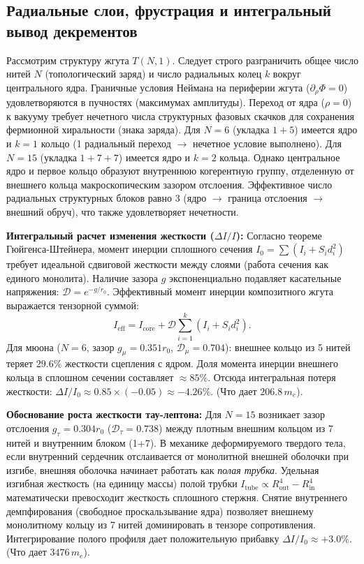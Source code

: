 \documentclass[11pt,a4paper]{article}
\begin{document}
\subsection{Радиальные слои, фрустрация и интегральный вывод декрементов}
Рассмотрим структуру жгута $T(N,1)$. Следует строго разграничить общее число нитей $N$ (топологический заряд) и число радиальных колец $k$ вокруг центрального ядра. 
Граничные условия Неймана на периферии жгута ($\partial_\rho \Phi = 0$) удовлетворяются в пучностях (максимумах амплитуды). Переход от ядра ($\rho=0$) к вакууму требует нечетного числа структурных фазовых скачков для сохранения фермионной хиральности (знака заряда).
Для $N=6$ (укладка $1+5$) имеется ядро и $k=1$ кольцо (1 радиальный переход $\to$ нечетное условие выполнено).
Для $N=15$ (укладка $1+7+7$) имеется ядро и $k=2$ кольца. Однако центральное ядро и первое кольцо образуют внутреннюю когерентную группу, отделенную от внешнего кольца макроскопическим зазором отслоения. Эффективное число радиальных структурных блоков равно 3 (ядро $\to$ граница отслоения $\to$ внешний обруч), что также удовлетворяет нечетности.

\textbf{Интегральный расчет изменения жесткости ($\Delta I/I$):}
Согласно теореме Гюйгенса-Штейнера, момент инерции сплошного сечения $I_0 = \sum (I_i + S_i d_i^2)$ требует идеальной сдвиговой жесткости между слоями (работа сечения как единого монолита). Наличие зазора $g$ экспоненциально подавляет касательные напряжения: $\mathcal{D} = e^{-g/r_0}$. Эффективный момент инерции композитного жгута выражается тензорной суммой:
\begin{equation}
I_{\text{eff}} = I_{\text{core}} + \mathcal{D} \sum_{i=1}^{k} \left( I_i + S_i d_i^2 \right).
\end{equation}
Для мюона ($N=6$, зазор $g_\mu = 0.351 r_0$, $\mathcal{D}_\mu = 0.704$): внешнее кольцо из 5 нитей теряет $29.6\%$ жесткости сцепления с ядром. Доля момента инерции внешнего кольца в сплошном сечении составляет $\approx 85\%$. Отсюда интегральная потеря жесткости: $\Delta I / I_0 \approx 0.85 \times (-0.05) \approx -4.26\%$. (Что дает $206.8 \, m_e$).

\textbf{Обоснование роста жесткости тау-лептона:}
Для $N=15$ возникает зазор отслоения $g_\tau = 0.304 r_0$ ($\mathcal{D}_\tau = 0.738$) между плотным внешним кольцом из 7 нитей и внутренним блоком (1+7). В механике деформируемого твердого тела, если внутренний сердечник отслаивается от монолитной внешней оболочки при изгибе, внешняя оболочка начинает работать как \textit{полая трубка}. 
Удельная изгибная жесткость (на единицу массы) полой трубки $I_{\text{tube}} \propto R_{\text{out}}^4 - R_{\text{in}}^4$ математически превосходит жесткость сплошного стержня. Снятие внутреннего демпфирования (свободное проскальзывание ядра) позволяет внешнему монолитному кольцу из 7 нитей доминировать в тензоре сопротивления. Интегрирование полого профиля дает положительную прибавку $\Delta I / I_0 \approx +3.0\%$. (Что дает $3476 \, m_e$).
	
\end{document}
